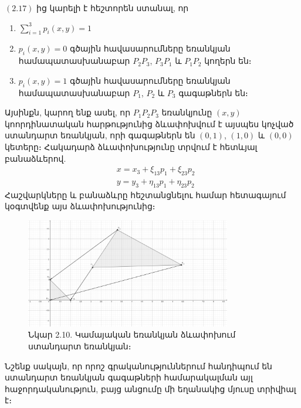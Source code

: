 \documentclass[fleqn, bachelor,subf,12pt,notitlepage]{article}
\begin{document}
\newpage
{}

 $\left(2.17\right)$ ից կարելի է հեշտորեն ստանալ, որ 

\begin{enumerate}[leftmargin=0.0cm]
\item
$\sum_{i=1}^{3}p_{i}\left(x,y\right)=1$
\item
$p_{i}\left(x,y\right)=0$ գծային հավասարումները եռանկյան համապատասխանաբար $P_{2}P_{3}$, $P_{3}P_{1}$ և $P_{1}P_{2}$ կողերն են։
\item
$p_{i}\left(x,y\right)=1$ գծային հավասարումները եռանկյան համապատասխանաբար $P_{1}$, $P_{2}$ և $P_{3}$ գագաթներն են։
\end{enumerate}

Այսինքն, կարող ենք ասել, որ $P_{1}P_{2}P_{3}$ եռանկյունը $(x, y)$ կոորդինատական հարթությունից ձևափոխվում է այսպես կոչված ստանդարտ եռանկյան, որի գագաթներն են $(0, 1)$, $(1, 0)$ և $(0, 0)$ կետերը։ Հակադարձ ձևափոխությունը տրվում է հետևյալ բանաձևերով.
\begin{equation}
\begin{aligned}
&x = x_{3} + \xi_{13}p_{1}+\xi_{23}p_{2}\\
&y = y_{3} + \eta_{13}p_{1}+\eta_{23}p_{2}
\end{aligned}
\end{equation}
Հաշվարկները և բանաձևրը հեշտանցնելու համար հետագայում կօգտվենք այս ձևափոխությունից։
\begin{figure}[H]
\centering
\includegraphics[width=0.8\textwidth]{images/standard_triangle_transformation}
\captionsetup{labelformat=empty}
\caption{Նկար 2.10. Կամայական եռանկյան ձևափոխում ստանդարտ եռանկյան։}
\end{figure}
Նշենք սակայն, որ որոշ գրականություններում հանդիպում են ստանդարտ եռանկյան գագաթների համարակալման այլ հաջորդականություն, բայց անցումը մի եղանակից մյուսը տրիվիալ է։
\newpage
\end{document}
